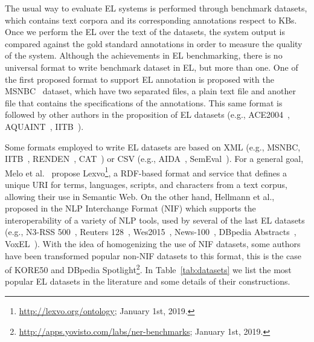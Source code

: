 \documentclass[sigconf]{acmart}
\begin{document}
The usual way to evaluate EL systems is performed through benchmark datasets, which contains text corpora and its corresponding annotations respect to KBs. Once we perform the EL over the text of the datasets, the system output is compared against the gold standard annotations in order to measure the quality of the system. Although the achievements in EL benchmarking, there is no universal format to write benchmark dataset in EL, but more than one. One of the first proposed format to support EL annotation is proposed with the MSNBC~\cite{cucerzan2007large} dataset, which have two separated files, a plain text file and another file that contains the specifications of the annotations. This same format is followed by other authors in the proposition of EL datasets (e.g., ACE2004~\cite{aquaint}, AQUAINT~\cite{aquaint}, IITB~\cite{IITB2009}). 

Some formats employed to write EL datasets are based on XML (e.g., MSNBC, IITB~\cite{IITB2009}, RENDEN~\cite{renden2016}, CAT~\cite{meantime2016}) or CSV (e.g., AIDA~\cite{aida2011}, SemEval~\cite{moro2015semeval}). For a general goal, Melo et al.~\cite{Lexvo2008} propose Lexvo\footnote{\url{http://lexvo.org/ontology}; January 1st, 2019.}, a RDF-based format and service that defines a unique URI for terms, languages, scripts, and characters from a text corpus, allowing their use in Semantic Web. %
On the other hand, Hellmann et al., proposed in \cite{NIFpaper} the NLP Interchange Format (NIF) which supports the interoperability of a variety of NLP tools, used by several of the last EL datasets (e.g., N3-RSS 500~\cite{N3}, Reuters 128~\cite{N3}, Wes2015~\cite{wes2015}, News-100~\cite{N3}, DBpedia Abstracts~\cite{abstracts2016}, VoxEL~\cite{VoxEL2018}). With the idea of homogenizing the use of NIF datasets, some authors have been transformed popular non-NIF datasets to this format, this is the case of  KORE50 and DBpedia Spotlight\footnote{\url{http://apps.yovisto.com/labs/ner-benchmarks}; January 1st, 2019.}. In Table~\ref{tab:datasets} we list the most popular EL datasets in the literature and some details of their constructions.
\end{document}
